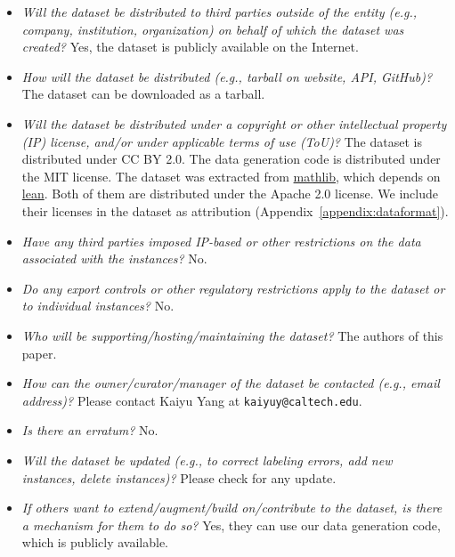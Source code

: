 \begin{itemize}

\item \emph{Will the dataset be distributed to third parties outside of the entity (e.g., company, institution, organization) on behalf of which the dataset was created?} Yes, the dataset is publicly available on the Internet.

\item \emph{How will the dataset be distributed (e.g., tarball on website, API, GitHub)?} The dataset can be downloaded as a tarball.

\item \emph{Will the dataset be distributed under a copyright or other intellectual property (IP) license, and/or under applicable terms of use (ToU)?} The dataset is distributed under CC BY 2.0. The data generation code is distributed under the MIT license. The dataset was extracted from \href{https://github.com/leanprover-community/mathlib}{mathlib}, which depends on \href{https://github.com/leanprover-community/lean}{lean}. Both of them are distributed under the Apache 2.0 license. We include their licenses in the dataset as attribution (Appendix~\ref{appendix:dataformat}).

\item \emph{Have any third parties imposed IP-based or other restrictions on the data associated with the instances?} No.

\item \emph{Do any export controls or other regulatory restrictions apply to the dataset or to individual instances?} No.

\end{itemize}


\begin{itemize}

\item \emph{Who will be supporting/hosting/maintaining the dataset?} The authors of this paper.

\item \emph{How can the owner/curator/manager of the dataset be contacted (e.g., email address)?} Please contact Kaiyu Yang at \texttt{kaiyuy@caltech.edu}.

\item \emph{Is there an erratum?} No.

\item \emph{Will the dataset be updated (e.g., to correct labeling errors, add new instances, delete instances)?} Please check {\weburl} for any update.

\item \emph{If others want to extend/augment/build on/contribute to the dataset, is there a mechanism for them to do so?} Yes, they can use our data generation code, which is publicly available.

\end{itemize}




